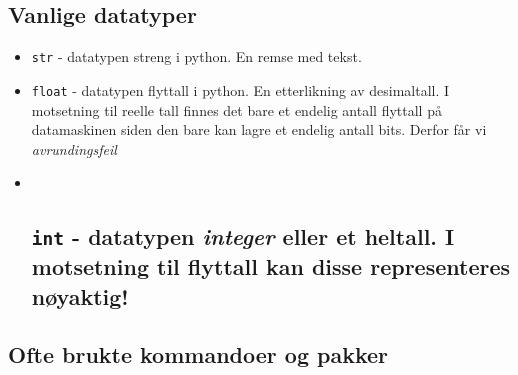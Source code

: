 \documentclass[11pt]{article}
\begin{document}
\hypertarget{vanlige-datatyper}{%
\subsection{Vanlige datatyper}\label{vanlige-datatyper}}

\begin{itemize}
\item
  \texttt{str} - datatypen streng i python. En remse med tekst.
\item
  \texttt{float} - datatypen flyttall i python. En etterlikning av
  desimaltall. I motsetning til reelle tall finnes det bare et endelig
  antall flyttall på datamaskinen siden den bare kan lagre et endelig
  antall bits. Derfor får vi \emph{avrundingsfeil}
\item ~
  \hypertarget{int---datatypen-integer-eller-et-heltall.-i-motsetning-til-flyttall-kan-disse-representeres-nuxf8yaktig}{%
  \subsection{\texorpdfstring{\texttt{int} - datatypen \emph{integer}
  eller et heltall. I motsetning til flyttall kan disse representeres
  nøyaktig!}{int - datatypen integer eller et heltall. I motsetning til flyttall kan disse representeres nøyaktig!}}\label{int---datatypen-integer-eller-et-heltall.-i-motsetning-til-flyttall-kan-disse-representeres-nuxf8yaktig}}
\end{itemize}

\hypertarget{ofte-brukte-kommandoer-og-pakker}{%
\subsection{Ofte brukte kommandoer og
pakker}\label{ofte-brukte-kommandoer-og-pakker}}
\end{document}
